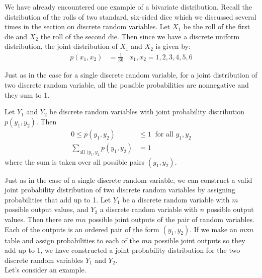 \documentclass[12pt]{article}
\theoremstyle{definition}
\theoremstyle{remark}
\begin{document}
We have already encountered one example of a bivariate distribution. Recall the distribution of the rolls of two standard, six-sided dice which we discussed several times in the section on discrete random variables. Let $X_1$ be the roll of the first die and $X_2$ the roll of the second die. Then since we have a discrete uniform distribution, the joint distribution of $X_1$ and $X_2$ is given by:
\begin{align*}
p(x_1, x_2) &= \frac{1}{36} & x_1, x_2 = 1, 2, 3, 4, 5, 6
\end{align*}

Just as in the case for a single discrete random variable, for a joint distribution of two discrete random variable, all the possible probabilities are nonnegative and they sum to 1.

\begin{framed}
Let $Y_1$ and $Y_2$ be discrete random variables with joint probability distribution $p(y_1, y_2)$. Then
\begin{align*}
0 \leq p(y_1, y_2) &\leq 1 \:\text{ for all }y_1, y_2 \\
\sum_{\text{all } (y_1, y_2} p(y_1, y_2) &= 1
\end{align*}
where the sum is taken over all possible pairs $(y_1, y_2)$.
\end{framed}

Just as in the case of a single discrete random variable, we can construct a valid joint probability distribution of two discrete random variables by assigning probabilities that add up to 1. Let $Y_1$ be a discrete random variable with $m$ possible output values, and $Y_2$ a discrete random variable with $n$ possible output values. Then there are $mn$ possible joint outputs of the pair of random variables. Each of the outputs is an ordered pair of the form $(y_1, y_2)$. If we make an $m$x$n$ table and assign probabilities to each of the $mn$ possible joint outputs so they add up to 1, we have constructed a joint probability distribution for the two discrete random variables $Y_1$ and $Y_2$.\\

Let's consider an example.
\end{document}
